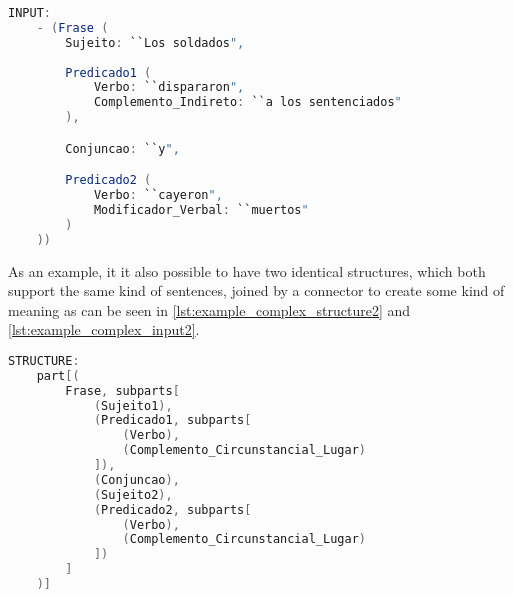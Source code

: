\begin{center}
\begin{minipage}{10cm}
\begin{lstlisting}[language=java, basicstyle=\tiny, label={lst:example_complex_input}, caption=Example of a more complex sentence input]
INPUT:
    - (Frase (
        Sujeito: ``Los soldados",
		
        Predicado1 (
            Verbo: ``dispararon",
            Complemento_Indireto: ``a los sentenciados"
        ),

        Conjuncao: ``y",

        Predicado2 (
            Verbo: ``cayeron",
            Modificador_Verbal: ``muertos"
        )
    ))
\end{lstlisting}
\end{minipage}
\end{center}

As an example, it it also possible to have two identical structures, which both support the same kind of sentences,
joined by a connector to create some kind of meaning as can be seen in \autoref{lst:example_complex_structure2} and \autoref{lst:example_complex_input2}.

\begin{center}
\begin{minipage}{12cm}
\begin{lstlisting}[language=java, basicstyle=\tiny, label={lst:example_complex_structure2}, caption=Example of a another more complex structure]
STRUCTURE:
    part[(
        Frase, subparts[
            (Sujeito1),
            (Predicado1, subparts[
                (Verbo),
                (Complemento_Circunstancial_Lugar)
            ]),
            (Conjuncao),
            (Sujeito2),
            (Predicado2, subparts[
                (Verbo),
                (Complemento_Circunstancial_Lugar)
            ])
        ]
    )]
\end{lstlisting}
\end{minipage}
\end{center}


